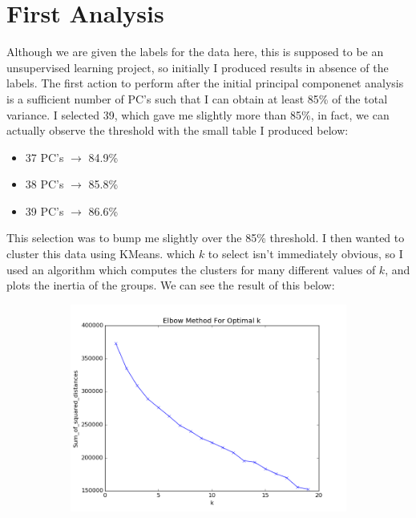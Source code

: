 \documentclass[20pt]{article} %
\begin{document}
\section{First Analysis}
Although we are given the labels for the data here, this is supposed to be an unsupervised learning project, so initially I produced results in absence of the labels.  The first action to perform after the initial principal componenet analysis is a sufficient number of PC's such that I can obtain at least 85\% of the total variance.  I selected 39, which gave me slightly more than 85\%, in fact, we can actually observe the threshold with the small table I produced below:
\begin{itemize}
\item 37 PC's $\rightarrow$ 84.9\%
\item 38 PC's $\rightarrow$ 85.8\%
\item 39 PC's $\rightarrow$ 86.6\%
\end{itemize}
\newpage
This selection was to bump me slightly over the 85\% threshold.  I then wanted to cluster this data using KMeans.  which $k$ to select isn't immediately obvious, so I used an algorithm which computes the clusters for many different values of $k$, and plots the inertia of the groups.  We can see the result of this below: 
\begin{figure}[!htbp]
  	\centering
   	\begin{subfigure}[p]{0.7\linewidth}
    	\includegraphics[width=\linewidth]{./figures/kmax20.png}
   	\end{subfigure}
\end{figure}
\end{document}
